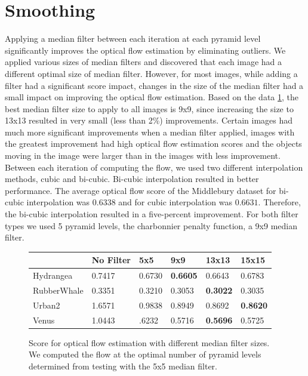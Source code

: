 \documentclass[10pt,twocolumn,letterpaper]{article}
\begin{document}
\section{Smoothing}
Applying a median filter between each iteration at each pyramid level significantly improves the optical flow estimation by eliminating outliers. We applied various sizes of median filters and discovered that each image had a different optimal size of median filter. However, for most images, while adding a filter had a significant score impact, changes in the size of the median filter had a small impact on improving the optical flow estimation.  Based on the data \ref{fig:medFiltTable}, the best median filter size to apply to all images is 9x9, since increasing the size to 13x13 resulted in very small (less than 2\%) improvements. Certain images had much more significant improvements when a median filter applied, images with the greatest improvement had high optical flow estimation scores and the objects moving in the image were larger than in the images with less improvement.
Between each iteration of computing the flow, we used two different interpolation methods, cubic and bi-cubic. Bi-cubic interpolation resulted in better performance. The average optical flow score of the Middlebury dataset for bi-cubic interpolation was $0.6338$ and for cubic interpolation was $0.6631$. Therefore, the bi-cubic interpolation resulted in a five-percent improvement. For both filter types we used 5 pyramid levels, the charbonnier penalty function, a 9x9 median filter.

\begin{figure}
\begin{tabularx}{1.0\textwidth} {|X |X |X |X |X |X|}
\hline
 & No Filter & 5x5 & 9x9 & 13x13 & 15x15 \\
\hline 
Hydrangea & 0.7417 & 0.6730 & \bf{0.6605} & 0.6643 & 0.6783 \\
\hline 
RubberWhale & 0.3351 & 0.3210 & 0.3053 & \bf{0.3022} &  0.3035\\
\hline 
Urban2 &  1.6571 & 0.9838 & 0.8949 & 0.8692 & \bf{0.8620}\\
\hline 
Venus &  1.0443 & .6232 & 0.5716 & \bf{0.5696} &  0.5725 \\
\hline
\end{tabularx}
\caption{Score for optical flow estimation with different median filter sizes. We computed the flow at the optimal number of pyramid levels determined from testing with the 5x5 median filter.}
\label{fig:medFiltTable}
\end{figure}
\end{document}
